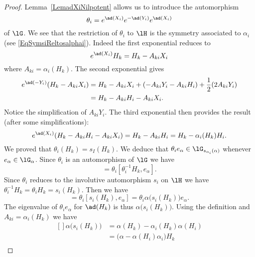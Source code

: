 \begin{proof}
	Lemma~\ref{LemadXiNilpotent} allows us to introduce the automorphism
	\begin{equation}
		\theta_i= e^{\ad(X_i)} e^{-\ad(Y_i)} e^{\ad(X_i)}
	\end{equation}
	of \( \lG\). We see that the restriction of \( \theta_i\) to \( \lH\) is the symmetry associated to \( \alpha_i\) (see \eqref{EqSymsiReltosalphai}). Indeed the first exponential reduces to
	\begin{equation}
		e^{\ad(X_i)}H_k=H_k-A_{ki}X_i
	\end{equation}
	where \( A_{ki}=\alpha_i(H_k)\). The second exponential gives
	\begin{equation}
		\begin{aligned}[]
			e^{\ad(-Y_i)}(H_k-A_{ki}X_i) & =H_k-A_{ki}X_i+(-A_{ki}Y_i-A_{ki}H_i)+\frac{ 1 }{2}(2A_{ki}Y_i) \\
			                             & =H_k-A_{ki}H_i-A_{ki}X_i.
		\end{aligned}
	\end{equation}
	Notice the simplification of \( A_{ki}Y_i\). The third exponential then provides the result (after some simplifications):
	\begin{equation}
		e^{\ad(X_i)}(H_k-A_{ki}H_i-A_{ki}X_i)=H_k-A_{ki}H_i=H_k-\alpha_i(H_k)H_i.
	\end{equation}
	We proved that \( \theta_i(H_k)=s_I(H_k)\).  We deduce that \( \theta_ie_{\alpha}\in\lG_{s_{\alpha_i}(\alpha)}\) whenever \( e_{\alpha}\in\lG_{\alpha}\). Since \( \theta_i\) is an automorphism of \( \lG\) we have
	\begin{equation}
		[H_k,\theta_ie_{\alpha}]=\theta_i[\theta_i^{-1}H_k,e_{\alpha}].
	\end{equation}
	Since \( \theta_i\) reduces to the involutive automorphism \( s_i\) on \( \lH\) we have \( \theta_i^{-1}H_k=\theta_iH_k=s_i(H_k)\). Then we have
	\begin{equation}
		[H_k,\theta_ie_{\alpha}]=\theta_i[s_i(H_k),e_{\alpha}]=\theta_i\alpha\big( s_i(H_k) \big)e_{\alpha}.
	\end{equation}
	The eigenvalue of \( \theta_ie_{\alpha}\) for \( \ad(H_k)\) is thus \( \alpha\big( s_i(H_k) \big)\). Using the definition and \( A_{ki}=\alpha_i(H_k)\) we have
	\begin{equation}
		\begin{aligned}[]
			\alpha\big( s_i(H_k) \big) & =\alpha(H_k)-\alpha_i(H_k)\alpha(H_i)      \\
			                           & =\big( \alpha-\alpha(H_i)\alpha_i \big)H_k \\

\end{aligned}
\end{equation}
\end{proof}

